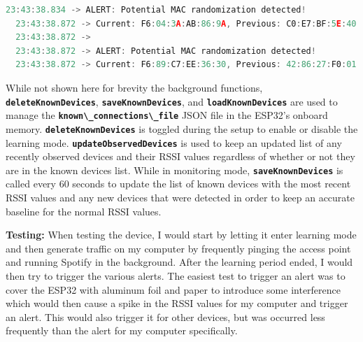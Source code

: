\documentclass[letterpaper, 11pt]{article}
\newcommand{\secHeader}[1]{\vspace{2mm} \noindent \textbf{#1:}\vspace{-4mm}}
\begin{document}
\vspace{2mm}
\begin{lstlisting}[language=C++, caption=Serial Output for Spoof Detection, label=lst:spoof detector serial output]
  23:43:38.834 -> ALERT: Potential MAC randomization detected!
  23:43:38.872 -> Current: F6:04:3A:AB:86:9A, Previous: C0:E7:BF:5E:40:C6
  23:43:38.872 -> 
  23:43:38.872 -> ALERT: Potential MAC randomization detected!
  23:43:38.872 -> Current: F6:89:C7:EE:36:30, Previous: 42:86:27:F0:01:AE
\end{lstlisting}
\vspace{2mm}
\indent While not shown here for brevity the background functions, \textbf{\lstinline[]|deleteKnownDevices|}, \textbf{\lstinline[]|saveKnownDevices|}, and \textbf{\lstinline[]|loadKnownDevices|} are used to 
manage the \textbf{\lstinline[]|known\_connections\_file|} JSON file in the ESP32's onboard memory. \textbf{\lstinline[]|deleteKnownDevices|} is toggled during the setup to enable or disable the 
learning mode. \textbf{\lstinline[]|updateObservedDevices|} is used to keep an updated list of any recently observed devices and their RSSI values regardless of whether or not they are in the 
known devices list. While in monitoring mode, \textbf{\lstinline[]|saveKnownDevices|} is called every 60 seconds to update the list of known devices with the most recent RSSI values and any new
devices that were detected in order to keep an accurate baseline for the normal RSSI values.

\newpage
\secHeader{Testing}
\vspace{5mm}
\newline
\indent When testing the device, I would start by letting it enter learning mode and then generate traffic on my computer by frequently pinging the access point and running Spotify in the background.
After the learning period ended, I would then try to trigger the various alerts. The easiest test to trigger an alert was to cover the ESP32 with aluminum foil and paper to introduce some interference
which would then cause a spike in the RSSI values for my computer and trigger an alert. This would also trigger it for other devices, but was occurred less frequently than the alert for my computer 
specifically.
\end{document}
